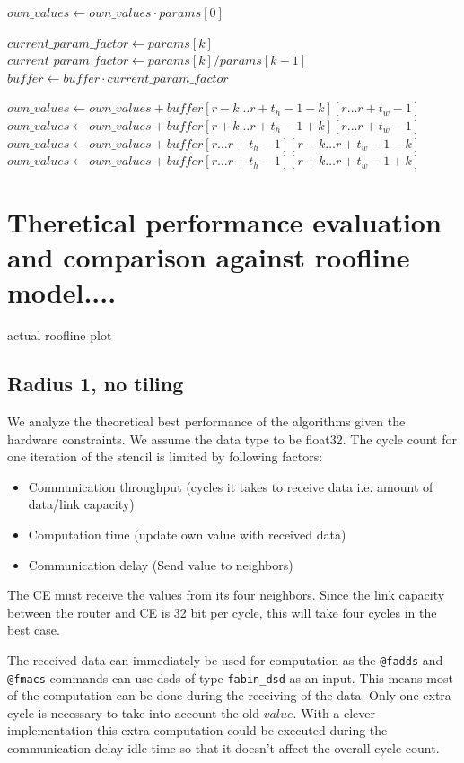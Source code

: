 \documentclass{article}
\begin{document}
\begin{algorithm}
\begin{algorithmic}[1]
        \State $own\_values \gets own\_values \cdot params[0]$
        
                \State $current\_param\_factor \gets params[k]$
            \Else
                \State $current\_param\_factor \gets params[k] / params[k-1]$
            \EndIf
            \State $buffer \gets buffer \cdot current\_param\_factor$
            
            \State $own\_values \gets own\_values + buffer[r-k \dots r+t_h-1-k][r \dots r+t_w-1]$
            \State $own\_values \gets own\_values + buffer[r+k \dots r+t_h-1+k][r \dots r+t_w-1]$
            \State $own\_values \gets own\_values + buffer[r \dots r+t_h-1][r-k \dots r+t_w-1-k]$
            \State $own\_values \gets own\_values + buffer[r \dots r+t_h-1][r+k \dots r+t_w-1+k]$
        \EndFor
    \EndFor
\EndProcedure
\end{algorithmic}
\end{algorithm}


\section{Theretical performance evaluation and comparison against roofline model....}
actual roofline plot
\subsection{Radius 1, no tiling}
We analyze the theoretical best performance of the algorithms given the hardware constraints.
We assume the data type to be float32.
The cycle count for one iteration of the stencil is limited by following factors:
\begin{itemize}
    \item Communication throughput (cycles it takes to receive data i.e. amount of data/link capacity)
    \item Computation time (update own value with received data)
    \item Communication delay (Send value to neighbors)
\end{itemize}
The CE must receive the values from its four neighbors. Since the link capacity between the router and CE is 32 bit per cycle, this will take four cycles in the best case.

The received data can immediately be used for computation as the \texttt{@fadds} and \texttt{@fmacs} commands can use dsds of type \texttt{fabin\_dsd} as an input. This means most of the computation can be done during the receiving of the data. Only one extra cycle is necessary to take into account the old $value$. With a clever implementation this extra computation could be executed during the communication delay idle time so that it doesn't affect the overall cycle count.
\end{document}
